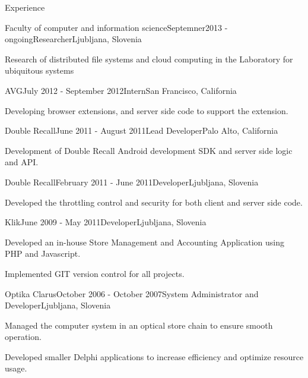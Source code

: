 \documentclass{resume} %
\begin{document}
\begin{rSection}{Experience}

\begin{rSubsection}{Faculty of computer and information science}{Septemner2013 - ongoing}{Researcher}{Ljubljana, Slovenia}
\item Research of distributed file systems and cloud computing in the Laboratory for ubiquitous systems
\end{rSubsection}


\begin{rSubsection}{AVG}{July 2012 - September 2012}{Intern}{San Francisco, California}
\item Developing browser extensions, and server side code to support the extension.
\end{rSubsection}


\begin{rSubsection}{Double Recall}{June 2011 - August 2011}{Lead Developer}{Palo Alto, California}
\item Development of Double Recall Android development SDK and server side logic and API.
\end{rSubsection}


\begin{rSubsection}{Double Recall}{February 2011 - June 2011}{Developer}{Ljubljana, Slovenia}
\item Developed the throttling control and security for both client and server side code.
\end{rSubsection}


\begin{rSubsection}{Klik}{June 2009 - May 2011}{Developer}{Ljubljana, Slovenia}
\item Developed an in-house Store Management and Accounting Application using PHP and Javascript.
\item Implemented GIT version control for all projects.
\end{rSubsection}


\begin{rSubsection}{Optika Clarus}{October 2006 - October 2007}{System Administrator and Developer}{Ljubljana, Slovenia}
\item Managed the computer system in an optical store chain to ensure smooth operation.
\item Developed smaller Delphi applications to increase efficiency and optimize resource usage.
\end{rSubsection}


\end{rSection}
\end{document}
